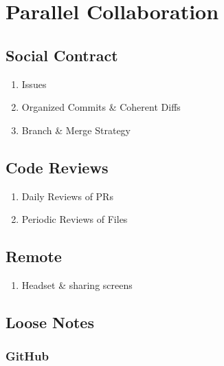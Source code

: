 \documentclass[]{book}
\providecommand{\tightlist}{%
  \setlength{\itemsep}{0pt}\setlength{\parskip}{0pt}}
\begin{document}
\hypertarget{collaboration}{%
\chapter{Parallel Collaboration}\label{collaboration}}

\hypertarget{social-contract}{%
\section{Social Contract}\label{social-contract}}

\begin{enumerate}
\def\labelenumi{\arabic{enumi}.}
\tightlist
\item
  Issues
\item
  Organized Commits \& Coherent Diffs
\item
  Branch \& Merge Strategy
\end{enumerate}

\hypertarget{code-reviews}{%
\section{Code Reviews}\label{code-reviews}}

\begin{enumerate}
\def\labelenumi{\arabic{enumi}.}
\tightlist
\item
  Daily Reviews of PRs
\item
  Periodic Reviews of Files
\end{enumerate}

\hypertarget{remote}{%
\section{Remote}\label{remote}}

\begin{enumerate}
\def\labelenumi{\arabic{enumi}.}
\tightlist
\item
  Headset \& sharing screens
\end{enumerate}

\hypertarget{loose-notes}{%
\section{Loose Notes}\label{loose-notes}}

\hypertarget{github}{%
\subsection{GitHub}\label{github}}
\end{document}
